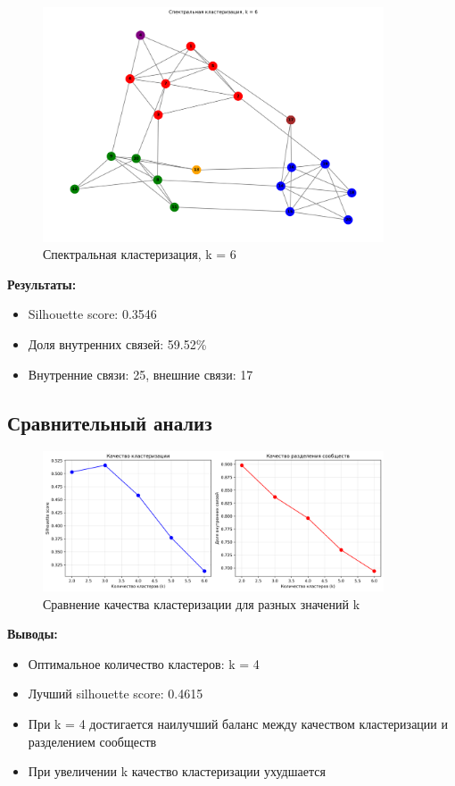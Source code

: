 \begin{figure}[H]
    \centering
    \includegraphics[width=0.9\textwidth]{images/task1/clustering_k6.png}
    \caption{Спектральная кластеризация, k = 6}
\end{figure}

\textbf{Результаты:}
\begin{itemize}
    \item Silhouette score: 0.3546
    \item Доля внутренних связей: 59.52\%
    \item Внутренние связи: 25, внешние связи: 17
\end{itemize}

\subsection*{Сравнительный анализ}

\begin{figure}[H]
    \centering
    \includegraphics[width=0.9\textwidth]{images/task1/clustering_comparison.png}
    \caption{Сравнение качества кластеризации для разных значений k}
\end{figure}

\textbf{Выводы:}
\begin{itemize}
    \item Оптимальное количество кластеров: k = 4
    \item Лучший silhouette score: 0.4615
    \item При k = 4 достигается наилучший баланс между качеством кластеризации и разделением сообществ
    \item При увеличении k качество кластеризации ухудшается
\end{itemize}

